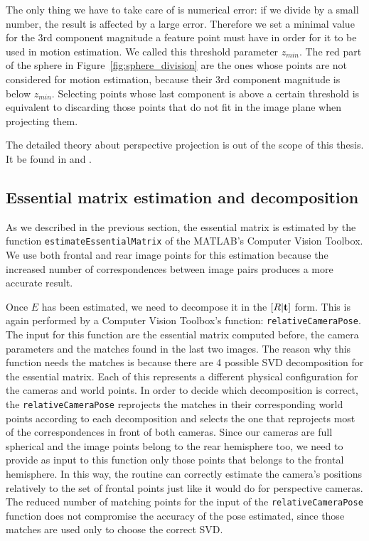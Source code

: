 The only thing we have to take care of is numerical error: if we divide by a 
small number, the result is affected by a large error. Therefore we
set a minimal value for the 3rd component magnitude a feature point must 
have in order for it to be used in motion estimation. 
We called this threshold parameter $z_{min}$.
The red part of the sphere in Figure~\ref{fig:sphere_division} are the ones
whose points are not considered for motion estimation, because their 
3rd component magnitude is below $z_{min}$.
Selecting points whose last component is above a certain threshold is 
equivalent to discarding those points that do not fit in the image plane
when projecting them.

The detailed theory about perspective projection is out of the scope of this 
thesis. It be found in \cite{szeliski2010computer} and \cite{Hartley2004}.

\subsection{Essential matrix estimation and decomposition}
As we described in the previous section, the essential matrix is estimated 
by the function {\tt estimateEssentialMatrix} of the MATLAB's 
Computer Vision Toolbox.
We use both frontal and rear image points for this estimation because
the increased number of correspondences between image pairs produces 
a more accurate result.

Once $E$ has been estimated, we need to decompose it in the 
\( [R|\mathbf{t} ] \) form. This is again performed by a Computer Vision 
Toolbox's function: {\tt relativeCameraPose}.
The input for this function are the essential matrix computed before, the 
camera parameters and the matches found in the last two images.
The reason why this function needs the matches is because there are 4 possible 
SVD decomposition for the essential matrix. Each of this represents a 
different physical configuration for the cameras and world points.
In order to decide which decomposition is correct, the {\tt relativeCameraPose}
reprojects the matches in their corresponding world points according to each 
decomposition and selects the one that reprojects most of the correspondences in 
front of both cameras.
Since our cameras are full spherical and the image points belong to the 
rear hemisphere too, we need to provide as input to this function only 
those points that belongs to the frontal hemisphere. In this way, the routine 
can correctly estimate the camera's positions relatively to the set of frontal
points just like it would do for perspective cameras.
The reduced number of matching points for the input of the 
{\tt relativeCameraPose} function does not compromise the accuracy of the pose 
estimated, since those matches are used only to choose the 
correct SVD.

